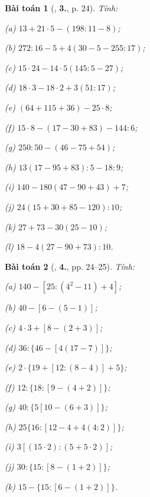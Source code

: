 \documentclass{article}
\numberwithin{equation}{section}
\newtheorem{baitoan}{Bài toán}[section]
\begin{document}
\begin{baitoan}[\cite{Trong_Toan_6_2021}, \textbf{3.}, p. 24]
	Tính:
	\begin{enumerate*}
		\item[(a)] $13 + 21\cdot 5 - (198:11 - 8)$;
		\item[(b)] $272:16 - 5 + 4(30 - 5 - 255:17)$;
		\item[(c)] $15\cdot 24 - 14\cdot 5(145:5 - 27)$;
		\item[(d)] $18\cdot 3 - 18\cdot 2 + 3(51:17)$;
		\item[(e)] $(64 + 115 + 36) - 25\cdot 8$;
		\item[(f)] $15\cdot 8 - (17 - 30 + 83) - 144:6$;
		\item[(g)] $250:50 - (46 - 75 + 54)$;
		\item[(h)] $13(17 - 95 + 83):5 - 18:9$;
		\item[(i)] $140 - 180(47 - 90 + 43) + 7$;
		\item[(j)] $24(15 + 30 + 85 - 120):10$;
		\item[(k)] $27 + 73 - 30(25 - 10)$;
		\item[(l)] $18 - 4(27 - 90 + 73):10$.
	\end{enumerate*}
\end{baitoan}

\begin{baitoan}[\cite{Trong_Toan_6_2021}, \textbf{4.}, pp. 24--25]
	Tính:
	\begin{enumerate*}
		\item[(a)] $140 - [25 :(4^2 - 11) + 4]$;
		\item[(b)] $40 - [6 - (5 - 1)]$;
		\item[(c)] $4\cdot 3 + [8 - (2 + 3)]$;
		\item[(d)] $36:\{46 - [4(17 - 7)]\}$;
		\item[(e)] $2\cdot\{19 + [12:(8 - 4)] + 5\}$;
		\item[(f)] $12:\{18:[9 - (4 + 2)]\}$;
		\item[(g)] $40:\{5[10 - (6 + 3)]\}$;
		\item[(h)] $25\{16:[12 - 4 + 4(4:2)]\}$;
		\item[(i)] $3[(15\cdot 2):(5 + 5\cdot 2)]$;
		\item[(j)] $30:\{15:[8 - (1 + 2)]\}$;
		\item[(k)] $15 - \{15:[6 - (1 + 2)]\}$.
	\end{enumerate*}
\end{baitoan}
\end{document}
